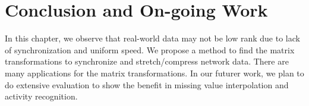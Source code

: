 \section{Conclusion and On-going Work}
In this chapter, we observe that real-world data may not be low rank due to lack of synchronization and uniform speed. We propose a method to find the matrix transformations to synchronize and stretch/compress network data. There are many applications for the matrix transformations. In our futurer work, we plan to do extensive evaluation to show the benefit in missing value interpolation and activity recognition.

